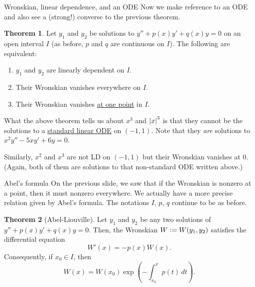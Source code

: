 \documentclass[dvipsnames]{beamer}
\theoremstyle{definition}
\newtheorem{thm}{Theorem}
\begin{document}
\begin{frame}{Wronskian, linear dependence, and an ODE}
  Now we make reference to an ODE and also see a (strong!) converse to the previous theorem. \pause

  \begin{thm}
    Let $y_{1}$ and $y_{2}$ be solutions to $y'' + p(x) y' + q(x) y = 0$ on an open interval $I$ \pause (as before, $p$ and $q$ are continuous on $I$). \pause The following are equivalent: \pause
    \begin{enumerate}[<+->]
      \item $y_{1}$ and $y_{2}$ are linearly dependent on $I$.
      \item Their Wronskian vanishes everywhere on $I$.
      \item Their Wronskian vanishes \underline{at one point} in $I$.
    \end{enumerate}
  \end{thm} \pause

  What the above theorem tells us about $x^{3}$ and ${\left\lvert x \right\lvert}^{3}$ is that they cannot be the solutions to a \underline{standard linear ODE} on $(-1, 1)$. \pause Note that they \emph{are} solutions to $x^{2} y'' - 5xy' + 6y = 0$. \pause

  Similarly, $x^{2}$ and $x^{3}$ are not LD on $(-1, 1)$ but their Wronskian vanishes at $0$. \pause (Again, both of them are solutions to that non-standard ODE written above.)
\end{frame}
\begin{frame}{Abel's formula}
  On the previous slide, we saw that if the Wronskian is nonzero at a point, then it must nonzero everywhere. \pause We actually have a more precise relation given by Abel's formula. \pause The notations $I$, $p$, $q$ continue to be as before. \pause

  \begin{thm}[Abel-Liouville]
    Let $y_{1}$ and $y_{2}$ be any two solutions of $y'' + p(x) y' + q(x) y = 0$. \pause Then, the Wronskian $W \vcentcolon= W(y_{1}, y_{2})$ satisfies the differential equation \pause 
    \begin{equation*} 
      W'(x) = -p(x) W(x).
    \end{equation*}
    \pause Consequently, if $x_{0} \in I$, then
    \begin{equation*} 
      W(x) = W(x_{0}) \exp\left(-\int_{x_{0}}^{x} p(t) \,dt\right).
    \end{equation*}
  \end{thm}
\end{frame}
\end{document}
